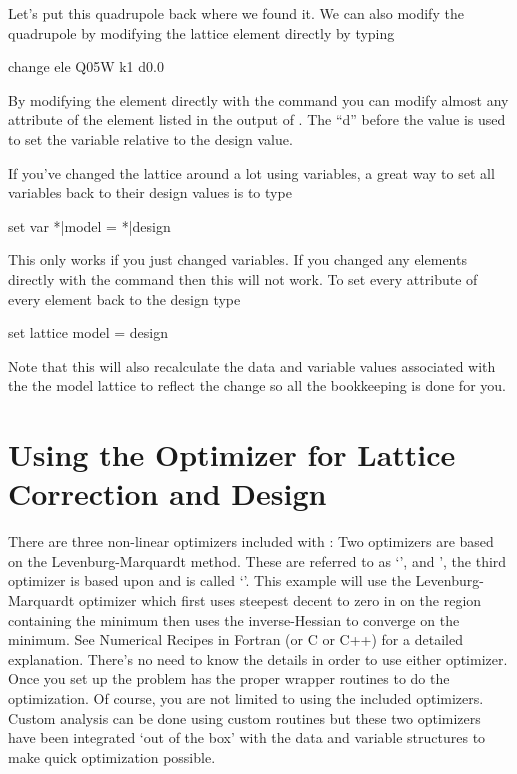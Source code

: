 Let's put this quadrupole back where we found it. We can also modify
the quadrupole by modifying the lattice element directly by typing
\begin{example}
  change ele Q05W k1 d0.0
\end{example}
By modifying the element directly with the  command
you can modify almost any attribute of the element listed in the
output of .  The ``d'' before the value is used to
set the variable relative to the design value.

If you've changed the lattice around a lot using variables, a great
way to set all variables back to their design values is to type
\begin{example}
  set var *|model = *|design
\end{example}
This only works if you just changed variables. If you changed any
elements directly with the  command then this will not
work. To set every attribute of every element back to the design type
\begin{example}
  set lattice model = design
\end{example}
Note that this will also recalculate the data and variable values
associated with the the model lattice to reflect the change so all the
bookkeeping is done for you.


\section{Using the Optimizer for Lattice Correction and Design}
\label{s:optimizer}

There are three non-linear optimizers included with \tao: Two
optimizers are based on the Levenburg-Marquardt method. These are
referred to as `', and ', the third optimizer is
based upon  and is called `'. This example
will use the Levenburg-Marquardt optimizer which first uses steepest
decent to zero in on the region containing the minimum then uses the
inverse-Hessian to converge on the minimum. See Numerical Recipes in
Fortran (or C or C++) for a detailed explanation. There's no need to
know the details in order to use either optimizer. Once you set up the
problem \tao has the proper wrapper routines to do the
optimization. Of course, you are not limited to using the included
optimizers. Custom analysis can be done using custom routines but
these two optimizers have been integrated `out of the box' with the
\tao data and variable structures to make quick optimization possible.


